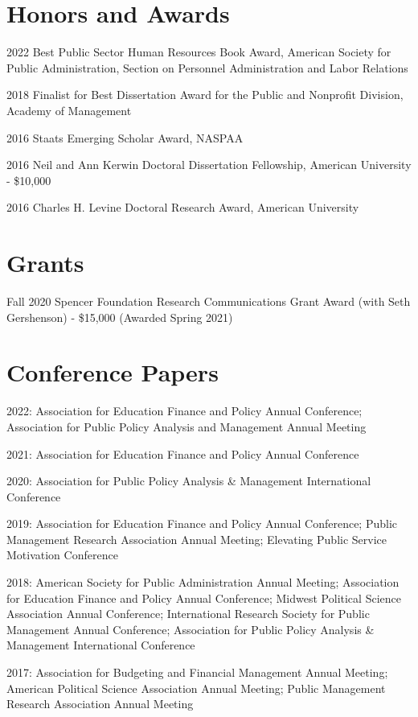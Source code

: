 \documentclass[margin,line]{res}
\begin{document}
\begin{resume}
\section{\sc Honors and Awards}
2022 Best Public Sector Human Resources Book Award, American Society for Public Administration, Section on Personnel Administration and Labor Relations

2018 Finalist for Best Dissertation Award for the Public and Nonprofit Division, Academy of Management

2016 Staats Emerging Scholar Award, NASPAA

2016 Neil and Ann Kerwin Doctoral Dissertation Fellowship, American University - \$10,000

2016 Charles H. Levine Doctoral Research Award, American University

\section{\sc Grants}
Fall 2020 Spencer Foundation Research Communications Grant Award (with Seth Gershenson) - \$15,000 (Awarded Spring 2021)

\section{\sc Conference Papers}
\begin{hangparas}{.25in}{1}
2022: Association for Education Finance and Policy Annual Conference; Association for Public Policy Analysis and Management Annual Meeting

2021: Association for Education Finance and Policy Annual Conference

2020: Association for Public Policy Analysis \& Management International Conference

2019: Association for Education Finance and Policy Annual Conference; Public Management Research Association Annual Meeting; Elevating Public Service Motivation Conference

2018: American Society for Public Administration Annual Meeting; Association for Education Finance and Policy Annual Conference; Midwest Political Science Association Annual Conference; International Research Society for Public Management Annual Conference; Association for Public Policy Analysis \& Management International Conference

2017: Association for Budgeting and Financial Management Annual Meeting;  American Political Science Association Annual Meeting; Public Management Research Association Annual Meeting


\end{hangparas}
\end{resume}
\end{document}

